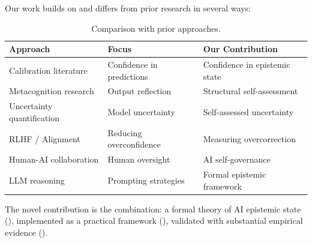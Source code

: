 Our work builds on and differs from prior research in several ways:

\begin{table}[h]
\centering
\begin{tabular}{lll}
\toprule
\textbf{Approach} & \textbf{Focus} & \textbf{Our Contribution} \\
\midrule
Calibration literature & Confidence in predictions & Confidence in epistemic state \\
Metacognition research & Output reflection & Structural self-assessment \\
Uncertainty quantification & Model uncertainty & Self-assessed uncertainty \\
RLHF / Alignment & Reducing overconfidence & Measuring overcorrection \\
Human-AI collaboration & Human oversight & AI self-governance \\
LLM reasoning & Prompting strategies & Formal epistemic framework \\
\bottomrule
\end{tabular}
\caption{Comparison with prior approaches.}
\label{tab:related-work-comparison}
\end{table}

The novel contribution is the combination: a formal theory of AI epistemic state (), implemented as a practical framework (), validated with substantial empirical evidence ().
